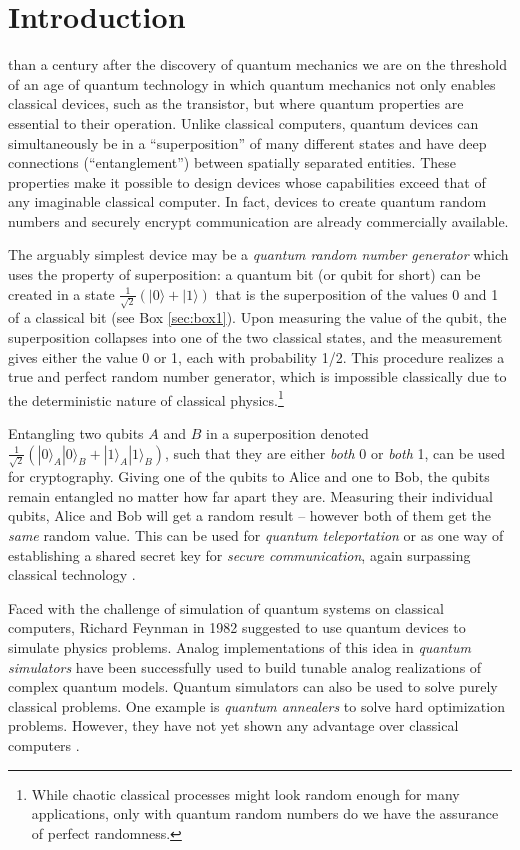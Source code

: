 \documentclass[journal]{IEEEtran}
\begin{document}
\section{Introduction}

 than a century after the discovery of quantum mechanics we are on the threshold of an age of quantum technology in which quantum mechanics not only enables classical devices,  such as the transistor, but where quantum properties are essential to their operation. Unlike classical computers, quantum devices can simultaneously be in a ``superposition'' of many different states and have deep connections (``entanglement'') between spatially separated entities.  These properties make it possible to design devices whose capabilities exceed that of any imaginable classical computer.  In fact, devices to create quantum random numbers and securely encrypt communication are already commercially available. 

The arguably simplest device may be a {\em quantum random number generator} which uses the property of superposition:  a quantum bit (or qubit for short) can be created in a state $\frac{1}{\sqrt{2}}(|0\rangle + |1\rangle)$ that is the superposition  of the values 0 and 1 of a classical bit (see Box \ref{sec:box1}). Upon measuring the value of the qubit, the superposition collapses into one of the two classical states, and the measurement gives either the value 0 or 1, each with probability 1/2. This procedure realizes a true and perfect random number generator, which is impossible classically due to the deterministic nature of classical physics.\footnote{While chaotic classical processes might look random enough for many applications, only with quantum random numbers do we have the assurance of perfect randomness.}

Entangling two qubits $A$ and $B$ in a superposition denoted $\frac{1}{\sqrt{2}}(|0\rangle_A|0\rangle_B + |1\rangle_A|1\rangle_B)$, such that they are either {\em both} 0 or {\em both} 1, can be used for cryptography. Giving one of the qubits to Alice and one to Bob, the qubits remain entangled no matter how far apart they are. Measuring their individual qubits, Alice and Bob will get a random result -- however both of them get the {\em same} random value. This can be used for {\em quantum teleportation} or as one way of establishing a shared secret key for  {\em secure  communication}, again surpassing classical technology \cite{RevModPhys.81.1301,EkertRenner2014}. 


Faced with the challenge of simulation of quantum systems on classical computers, Richard Feynman in 1982 \cite{Feynman1982} suggested to use quantum devices to simulate physics problems. Analog implementations of this idea in {\em quantum simulators }  \cite{RevModPhys.86.153}  have  been successfully used to build tunable analog realizations of complex quantum models. Quantum simulators can also be used to solve purely classical problems. One example is {\em quantum annealers} to solve hard optimization problems. However, they have not  yet shown any advantage over classical computers \cite{speedup}. 
\end{document}
